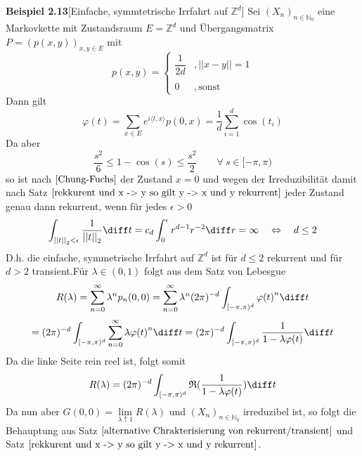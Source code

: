 \textbf{Beispiel 2.13}[Einfache, symmtetrische Irrfahrt auf $\mathbb{Z}^{d}$]
Sei $(X_{n})_{n \in \mathbb{N}_{0}}$ eine Markovkette mit Zustandsraum $E= \mathbb{Z}^{d}$ und Übergangsmatrix $P = (p(x,y))_{x,y \in E}$ mit
\begin{equation*}
p(x,y)=
\begin{cases}
\dfrac{1}{2d} & , \vert \vert x - y \vert \vert = 1\\
& \\
0 & , \mathrm{sonst}
\end{cases}
\end{equation*}
Dann gilt 
\begin{equation*}
\varphi (t) = \sum_{x \in E} e^{i \langle t,x \rangle} p(0,x) = \dfrac{1}{d} \sum_{i=1}^{d} \cos(t_{i})
\end{equation*}
Da aber 
\begin{equation*}
\dfrac{s^{2}}{6} \leq 1 - \cos(s) \leq \dfrac{s^{2}}{2} \qquad \forall \: s \in [- \pi, \pi)
\end{equation*}
so ist nach $\ref{Chung-Fuchs}$ der Zustand $x=0$ und wegen der Irreduzibilität damit nach Satz $\ref{rekkurent und x -> y so gilt y -> x und y rekurrent}$ jeder Zustand genau dann rekurrent, wenn für jedes $\epsilon > 0$
\begin{equation*}
\int_{{\vert \vert t \vert \vert}_{2} < \epsilon} \dfrac{1}{{\vert \vert t \vert \vert}_{2}} \diff t = c_{d} \int_{0}^{\epsilon} r^{d-1} r^{-2} \diff r = \infty \quad \Leftrightarrow \quad d \leq 2
\end{equation*}
D.h. die einfache, symmetrische Irrfahrt auf $\mathbb{Z}^{d}$ ist für $d \leq 2$ rekurrent und für $d>2$ transient.Für $\lambda \in (0,1)$ folgt aus dem Satz von Lebesgue
\begin{equation*}
R(\lambda) = \sum_{n=0}^{\infty} \lambda^{n} p_{n}(0,0) = \sum_{n = 0}^{\infty} \lambda^{n} (2 \pi)^{-d}  \int_{[-\pi, \pi)^{d}} {\varphi (t)}^{n} \diff t
\end{equation*}
\begin{equation*}
= (2\pi)^{-d}  \int_{[-\pi, \pi)^{d}} \sum_{n=0}^{\infty} {\lambda \varphi (t)}^{n} \diff t = (2\pi)^{-d}  \int_{[-\pi, \pi)^{d}} \dfrac{1}{1 - \lambda \varphi(t)} \diff t
\end{equation*}
Da die linke Seite rein reel ist, folgt somit
\begin{equation*}
R(\lambda) = (2\pi)^{-d}  \int_{[-\pi, \pi)^{d}} \mathfrak{R}({\dfrac{1}{1 - \lambda \varphi(t)}}) \diff t
\end{equation*}
Da nun aber $G(0,0) = \lim \limits_{\lambda \uparrow 1} R(\lambda)$ und $(X_{n})_{n \in \mathbb{N}_{0}}$ irreduzibel ist, so folgt die Behauptung aus Satz $\ref{alternative Chrakterisierung von rekurrent/transient}$ und Satz $\ref{rekkurent und x -> y so gilt y -> x und y rekurrent}$.


